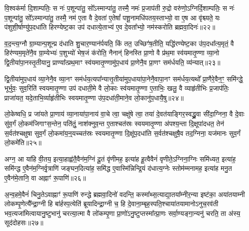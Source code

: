 {\anuvakamend[{ओष॑धयः॒ कञ्जु॑होति स्वप॒त्याया॒ष्टाद॑श च॥४॥}]}

वि॒श्वक॑र्मा दि॒शाम्पतिः॒ स नः॑ प॒शून्पा॑तु॒ सो᳚\-ऽस्मान्पा॑तु॒ तस्मै॒ नमः॑ प्र॒जाप॑ती रु॒द्रो वरु॑णो॒\-ऽग्निर्दि॒शाम्पतिः॒ स नः॑ प॒शून्पा॑तु॒ सो᳚\-ऽस्मान्पा॑तु॒ तस्मै॒ नम॑ ए॒ता वै दे॒वता॑ ए॒तेषां᳚ पशू॒नामधि॑पतय॒स्ताभ्यो॒ वा ए॒ष आ वृ॑श्च्यते॒ यः प॑शुशी॒र्\mbox{}षाण्यु॑प॒दधा॑ति हिरण्येष्ट॒का उप॑ दधात्ये॒ताभ्य॑ ए॒व दे॒वता᳚भ्यो॒ नम॑स्करोति ब्रह्मवा॒दिनः॑॥२२॥

व॒द॒न्त्य॒ग्नौ ग्रा॒म्यान्प॒शून्प्र द॑धाति शु॒चार॒ण्यान॑र्पयति॒ किं तत॒ उच्छिꣳ॑ष॒तीति॒ यद्धि॑रण्येष्ट॒का उ॑प॒दधा᳚त्य॒मृतं॒ वै हिर॑ण्यम॒मृते॑नै॒व ग्रा॒म्येभ्यः॑ प॒शुभ्यो॑ भेष॒जं क॑रोति॒ नैनान्॑ हिनस्ति प्रा॒णो वै प्र॑थ॒मा स्व॑यमातृ॒ण्णा व्या॒नो द्वि॒तीया॑पा॒नस्तृ॒तीयानु॒ प्राण्या᳚त्प्रथ॒माꣳ स्व॑यमातृ॒ण्णामु॑प॒धाय॑ प्रा॒णेनै॒व प्रा॒णꣳ सम॑र्धयति॒ व्य॑न्यात्॥२३॥

द्वि॒तीया॑मुप॒धाय॑ व्या॒नेनै॒व व्या॒नꣳ सम॑र्धय॒त्यपा᳚न्यात्तृ॒तीया॑मुप॒धाया॑पा॒नेनै॒वापा॒नꣳ सम॑र्धय॒त्यथो᳚ प्रा॒णैरे॒वैन॒ꣳ॒ समि॑न्द्धे॒ भूर्भुवः॒ सुव॒रिति॑ स्वयमातृ॒ण्णा उप॑ दधाती॒मे वै लो॒काः स्व॑यमातृ॒ण्णा ए॒ताभिः॒ खलु॒ वै व्याहृ॑तीभिः प्र॒जाप॑तिः॒ प्राजा॑यत॒ यदे॒ताभि॒र्व्याहृ॑तीभिः स्वयमातृ॒ण्णा उ॑प॒दधा॑ती॒माने॒व लो॒कानु॑प॒धायै॒षु॥२४॥

लो॒केष्वधि॒ प्र जा॑यते प्रा॒णाय॑ व्या॒नाया॑पा॒नाय॑ वा॒चे त्वा॒ चक्षु॑षे त्वा॒ तया॑ दे॒वत॑याङ्गिर॒स्वद्ध्रु॒वा सी॑दा॒ग्निना॒ वै दे॒वाः सु॑व॒र्गं लो॒कम॑जिगाꣳस॒न्तेन॒ पति॑तुं॒ नाश॑क्नुव॒न्त ए॒ताश्चत॑स्रः स्वयमातृ॒ण्णा अ॑पश्य॒न्ता दि॒क्षूपा॑दधत॒ तेन॑ स॒र्वत॑श्चक्षुषा सुव॒र्गं लो॒कमा॑य॒न्॒यच्चत॑स्रः स्वयमातृ॒ण्णा दि॒क्षू॑प॒दधा॑ति स॒र्वत॑श्चक्षुषै॒व तद॒ग्निना॒ यज॑मानः सुव॒र्गं लो॒कमे॑ति॥२५॥

{\anuvakamend[{ब्र॒ह्म॒वा॒दिनो॒ व्य॑न्यादे॒षु यज॑मान॒स्त्रीणि॑ च॥५॥}]}

अग्न॒ आ या॑हि वी॒तय॒ इत्या॒हाह्व॑तै॒वैन॑म॒ग्निं दू॒तं वृ॑णीमह॒ इत्या॑ह हू॒त्वैवैनं॑ वृणीते॒\-ऽग्निना॒ग्निः समि॑ध्यत॒ इत्या॑ह॒ समि॑न्द्ध ए॒वैन॑म॒ग्निर्वृ॒त्राणि॑ जङ्घन॒दित्या॑ह॒ समि॑द्ध ए॒वास्मि॑न्निन्द्रि॒यं द॑धात्य॒ग्नेः स्तोम॑म्मनामह॒ इत्या॑ह मनु॒त ए॒वैन॑मे॒तानि॒ वा अह्नाꣳ॑ रू॒पाणि॑॥२६॥

अ॒न्व॒हमे॒वैनं॑ चिनु॒ते\-ऽवाह्नाꣳ॑ रू॒पाणि॑ रुन्द्धे ब्रह्मवा॒दिनो॑ वदन्ति॒ कस्मा᳚थ्स॒त्याद्या॒तया᳚म्नीर॒न्या इष्ट॑का॒ अया॑तयाम्नी लोकम्पृ॒णेत्यै᳚न्द्रा॒ग्नी हि बा॑र्\mbox{}हस्प॒त्येति॑ ब्रूयादिन्द्रा॒ग्नी च॒ हि दे॒वाना॒म्बृह॒स्पति॒श्चाया॑तयामानो\-ऽनुच॒रव॑ती भव॒त्यजा॑मित्वायानु॒ष्टुभानु॑ चरत्या॒त्मा वै लो॑कम्पृ॒णा प्रा॒णो॑\-ऽनु॒ष्टुप्तस्मा᳚त्प्रा॒णः सर्वा॒ण्यङ्गा॒न्यनु॑ चरति॒ ता अ॑स्य॒ सूद॑दोहसः॥२७॥

